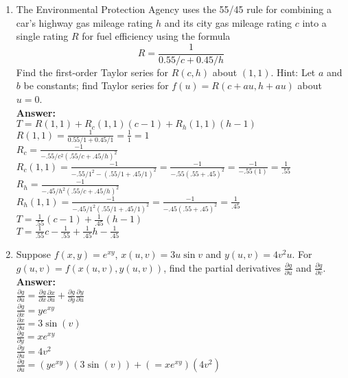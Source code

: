 \documentclass[11pt]{article}
\begin{document}
\begin{enumerate}
    \item The Environmental Protection Agency uses the 55/45 rule for combining a car's highway gas mileage rating $h$ and its city gas mileage rating $c$ into a single rating $R$ for fuel efficiency using the formula
    \[ 
        R = \frac{1}{0.55/c + 0.45/h}
    \]
    Find the first-order Taylor series for $R(c,h)$ about $(1,1)$.  Hint: Let $a$ and $b$ be constants; find Taylor series for $f(u) = R(c+au, h+au)$ about $u=0$. 
    \\
    \textbf{Answer:}
    \\
    $T=R(1,1)+R_c(1,1)(c-1)+R_h(1,1)(h-1)$
    \\
    $R(1,1)=\frac{1}{0.55/1 + 0.45/1}=\frac{1}{1}=1$
    \\
    $R_c=\frac{-1}{-.55/c^2 (.55/c +.45/h)^2}$
    \\
    $R_c(1,1)=\frac{-1}{-.55/1^2 - (.55/1 +.45/1)^2}=\frac{-1}{-.55  (.55 +.45)^2}= \frac{-1}{-.55(1)}= \frac{1}{.55} $
    \\
    $R_h= \frac{-1}{-.45/h^2 (.55/c +.45/h)^2} $
    \\
    $R_h(1,1)=\frac{-1}{-.45/1^2 (.55/1+.45/1)^2}= \frac{-1}{-.45 (.55 +.45)^2}=\frac{1}{.45}$
    \\
    $T= \frac{1}{.55}(c-1)+\frac{1}{.45}(h-1)$
    \\
    $T=\frac{1}{.55}c - \frac{1}{.55} + \frac{1}{.45}h -\frac{1}{.45}$
   
    
    
    
    
    
    
    \item Suppose $f(x,y) = e^{xy}$, $x(u,v) = 3u \sin v$ and $y(u,v) = 4v^2u$.  For $g(u,v) = f(x(u,v), y(u,v))$, find the partial derivatives $\frac{\partial g}{\partial u}$ and $\frac{\partial g}{\partial v}$.
    \\
    \textbf{Answer:}
    \\
    $\frac{\partial g}{\partial u}=\frac{\partial g}{\partial x} \frac{\partial x}{\partial u}+ \frac{\partial g}{\partial y} \frac{\partial y}{\partial u}$
    \\
    $\frac{\partial g}{\partial x}=ye^{xy}$
    \\
    $\frac{\partial x}{\partial u}=3 \sin (v)$
    \\
    $\frac{\partial g}{\partial y}=xe^{xy}$
    \\
    $\frac{\partial y}{\partial u}=4v^2$
    \\
    $\frac{\partial g}{\partial u}=(ye^{xy})(3 \sin (v))+(=xe^{xy})(4v^2)$
    

\end{enumerate}
\end{document}
